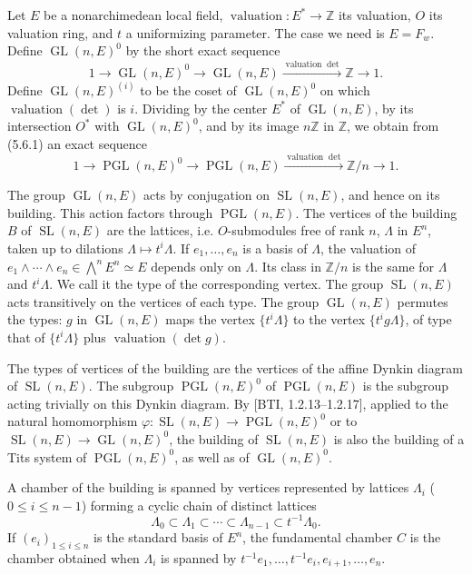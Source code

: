 \documentclass[10pt]{article}
\newcommand{\Z}{\mathbb Z}
\newcommand{\GL}{\operatorname{GL}}
\newcommand{\SL}{\operatorname{SL}}
\newcommand{\val}{\operatorname{valuation}}
\newcommand{\PGL}{\operatorname{PGL}}
\theoremstyle{deligne}
\newcommand{\heading}[1]{\vspace{0.7em}\noindent{\bfseries #1}\quad}
\begin{document}
\heading{5.6.} Let $E$ be a nonarchimedean local field, $\val:E^*\to\Z$ its valuation, $O$ its valuation ring, and $t$ a uniformizing parameter. The case we need is $E=F_w$. Define $\GL(n,E)^0$ by the short exact sequence
\begin{equation}\tag{5.6.1}
1\to\GL(n,E)^0\to\GL(n,E)\xrightarrow{\val\det}\Z\to1.
\end{equation}
Define $\GL(n,E)^{(i)}$ to be the coset of $\GL(n,E)^0$ on which $\val(\det)$ is $i$. Dividing by the center $E^*$ of $\GL(n,E)$, by its intersection $O^*$ with $\GL(n,E)^0$, and by its image $n\Z$ in $\Z$, we obtain from (5.6.1) an exact sequence
\begin{equation}\tag{5.6.2}
1\to\PGL(n,E)^0\to\PGL(n,E)\xrightarrow{\val\det}\Z/n\to1.
\end{equation}

The group $\GL(n,E)$ acts by conjugation on $\SL(n,E)$, and hence on its building. This action factors through $\PGL(n,E)$. The vertices of the building $B$ of $\SL(n,E)$ are the lattices, i.e. $O$-submodules free of rank $n$, $\Lambda$ in $E^n$, taken up to dilations $\Lambda\mapsto t^i\Lambda$. If $e_1,\ldots,e_n$ is a basis of $\Lambda$, the valuation of $e_1\wedge\cdots\wedge e_n\in\bigwedge^nE^n\simeq E$ depends only on $\Lambda$. Its class in $\Z/n$ is the same for $\Lambda$ and $t^i\Lambda$. We call it the type of the corresponding vertex. The group $\SL(n,E)$ acts transitively on the vertices of each type. The group $\GL(n,E)$ permutes the types: $g$ in $\GL(n,E)$ maps the vertex $\{t^i\Lambda\}$ to the vertex $\{t^ig\Lambda\}$, of type that of $\{t^i\Lambda\}$ plus $\val(\det g)$.

The types of vertices of the building are the vertices of the affine Dynkin diagram of $\SL(n,E)$. The subgroup $\PGL(n,E)^0$ of $\PGL(n,E)$ is the subgroup acting trivially on this Dynkin diagram. By [BTI, 1.2.13--1.2.17], applied to the natural homomorphism $\varphi:\SL(n,E)\to\PGL(n,E)^0$ or to $\SL(n,E)\to\GL(n,E)^0$, the building of $\SL(n,E)$ is also the building of a Tits system of $\PGL(n,E)^0$, as well as of $\GL(n,E)^0$.

A chamber of the building is spanned by vertices represented by lattices $\Lambda_i$ ($0\le i\le n-1$) forming a cyclic chain of distinct lattices
\[
\Lambda_0\subset\Lambda_1\subset\cdots\subset\Lambda_{n-1}\subset t^{-1}\Lambda_0.
\]
If $(e_i)_{1\le i\le n}$ is the standard basis of $E^n$, the fundamental chamber $C$ is the chamber obtained when $\Lambda_i$ is spanned by $t^{-1}e_1,\ldots,t^{-1}e_i,e_{i+1},\ldots,e_n$.
\end{document}
